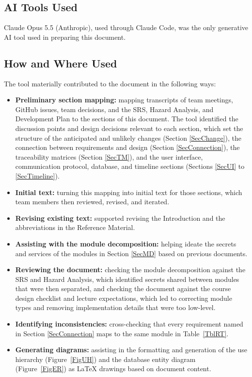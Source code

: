 \documentclass[12pt, titlepage]{article}
\begin{document}
\subsection{AI Tools Used}

Claude Opus 5.5 (Anthropic), used through Claude Code, was the only generative AI tool used in preparing this document.

\subsection{How and Where Used}

The tool materially contributed to the document in the following ways:
\begin{itemize}
\item \textbf{Preliminary section mapping:} mapping transcripts of team meetings, GitHub issues, team decisions, and the SRS, Hazard Analysis, and Development Plan to the sections of this document. The tool identified the discussion points and design decisions relevant to each section, which set the structure of the anticipated and unlikely changes (Section \ref{SecChange}), the connection between requirements and design (Section \ref{SecConnection}), the traceability matrices (Section \ref{SecTM}), and the user interface, communication protocol, database, and timeline sections (Sections \ref{SecUI} to \ref{SecTimeline}).
\item \textbf{Initial text:} turning this mapping into initial text for those sections, which team members then reviewed, revised, and iterated.
\item \textbf{Revising existing text:} supported revising the Introduction and the abbreviations in the Reference Material.
\item \textbf{Assisting with the module decomposition:} helping ideate the secrets and services of the modules in Section \ref{SecMD} based on previous documents.
\item \textbf{Reviewing the document:} checking the module decomposition against the SRS and Hazard Analysis, which identified secrets shared between modules that were then separated, and checking the document against the course design checklist and lecture expectations, which led to correcting module types and removing implementation details that were too low-level.
\item \textbf{Identifying inconsistencies:} cross-checking that every requirement named in Section \ref{SecConnection} maps to the same module in Table~\ref{TblRT}.
\item \textbf{Generating diagrams:} assisting in the formatting and generation of the use hierarchy (Figure~\ref{FigUH}) and the database entity diagram (Figure~\ref{FigER}) as \LaTeX{} drawings based on document content.
\end{itemize}
\end{document}
